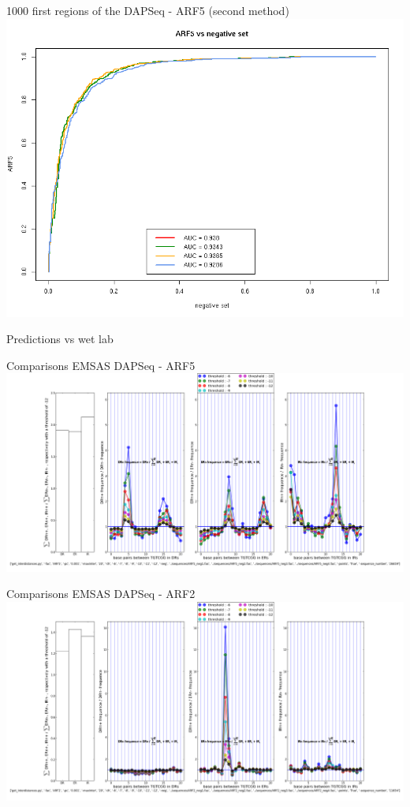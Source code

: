 \documentclass{beamer}
\begin{document}
\begin{frame}{1000 first regions of the DAPSeq - ARF5 (second method)}
  \includegraphics[width=1\textwidth,height=0.8\textheight,center]{ROC_ARF5_negative_set.png}
\end{frame}

\begin{frame}
\centering
\Huge{Predictions vs wet lab}
\end{frame}

\begin{frame}{Comparisons EMSAS DAPSeq - ARF5}
  \includegraphics[width=1\textwidth,height=0.8\textheight,center]{ARF5_interdistances_-6-7-8-9-10-11-12_points_4Neg.png}
\end{frame}

\begin{frame}{Comparisons EMSAS DAPSeq - ARF2}
  \includegraphics[width=1\textwidth,height=0.8\textheight,center]{ARF2_interdistances_-6-7-8-9-10-11-12_points_4Neg.png}
\end{frame}
\end{document}

